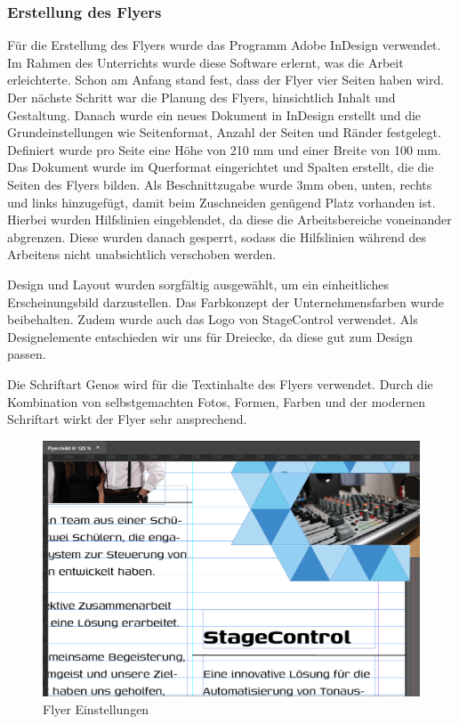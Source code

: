 \newpage
\subsubsection{Erstellung des Flyers}
Für die Erstellung des Flyers wurde das Programm Adobe InDesign verwendet. Im Rahmen des Unterrichts wurde diese Software erlernt, was die Arbeit erleichterte. Schon am Anfang stand fest, dass der Flyer vier Seiten haben wird. Der nächste Schritt war die Planung des Flyers, hinsichtlich Inhalt und Gestaltung. Danach wurde ein neues Dokument in InDesign erstellt und die Grundeinstellungen wie Seitenformat, Anzahl der Seiten und Ränder festgelegt. Definiert wurde pro Seite eine Höhe von 210 mm und einer Breite von 100 mm. Das Dokument wurde im Querformat eingerichtet und Spalten erstellt, die die Seiten des Flyers bilden. Als Beschnittzugabe wurde 3mm oben, unten, rechts und links hinzugefügt, damit beim Zuschneiden genügend Platz vorhanden ist. Hierbei wurden Hilfslinien eingeblendet, da diese die Arbeitsbereiche voneinander abgrenzen. Diese wurden danach gesperrt, sodass die Hilfslinien während des Arbeitens nicht unabsichtlich verschoben werden. 

Design und Layout wurden sorgfältig ausgewählt, um ein einheitliches Erscheinungsbild darzustellen. Das Farbkonzept der Unternehmensfarben wurde beibehalten. Zudem wurde auch das Logo von StageControl verwendet. Als Designelemente entschieden wir uns für Dreiecke, da diese gut zum Design passen. 

Die Schriftart Genos wird für die Textinhalte des Flyers verwendet. Durch die Kombination von selbstgemachten Fotos, Formen, Farben und der modernen Schriftart wirkt der Flyer sehr ansprechend. 

\begin{figure}[H]
	\centering
	\includegraphics[width=0.6\linewidth]{images/Flyer Einstellungen.png}
	\caption[Flyer Einstellungen]{Flyer Einstellungen}
	\label{fig:Flyer Einstellungen}
\end{figure}

